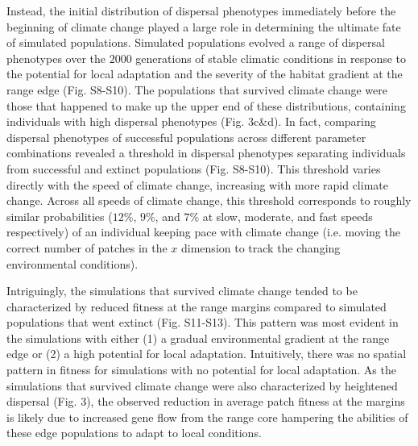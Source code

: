 \documentclass[12pt, oneside]{article}
\begin{document}
Instead, the initial distribution of dispersal phenotypes immediately before the beginning of climate change played a large role in determining the ultimate fate of simulated populations. Simulated populations evolved a range of dispersal phenotypes over the $2000$ generations of stable climatic conditions in response to the potential for local adaptation and the severity of the habitat gradient at the range edge (Fig. S8-S10). The populations that survived climate change were those that happened to make up the upper end of these distributions, containing individuals with high dispersal phenotypes (Fig. 3c\&d). In fact, comparing dispersal phenotypes of successful populations across different parameter combinations revealed a threshold in dispersal phenotypes separating individuals from successful and extinct populations (Fig. S8-S10). This threshold varies directly with the speed of climate change, increasing with more rapid climate change. Across all speeds of climate change, this threshold corresponds to roughly similar probabilities ($12\%$, $9\%$, and $7\%$ at slow, moderate, and fast speeds respectively) of an individual keeping pace with climate change (i.e. moving the correct number of patches in the $x$ dimension to track the changing environmental conditions).

Intriguingly, the simulations that survived climate change tended to be characterized by reduced fitness at the range margins compared to simulated populations that went extinct (Fig. S11-S13). This pattern was most evident in the simulations with either (1) a gradual environmental gradient at the range edge or (2) a high potential for local adaptation. Intuitively, there was no spatial pattern in fitness for simulations with no potential for local adaptation. As the simulations that survived climate change were also characterized by heightened dispersal (Fig. 3), the observed reduction in average patch fitness at the margins is likely due to increased gene flow from the range core hampering the abilities of these edge populations to adapt to local conditions.
\end{document}
